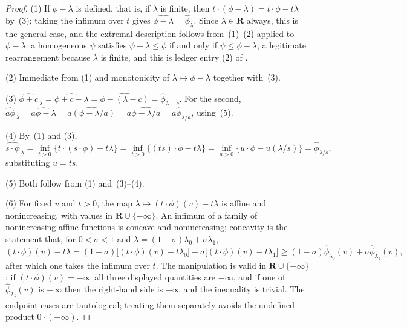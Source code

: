 \begin{proof}
(1)  If $\phi-\lambda$ is defined, that is, if $\lambda$ is finite,
then $t\cdot(\phi-\lambda)=t\cdot\phi-t\lambda$ by
\,(3); taking the infimum over $t$ gives
$\widehat{\phi-\lambda}=\widehat\phi_\lambda$.  Since
$\lambda\in\mathbf R$ always, this is the general case, and the extremal
description follows from
\,(1)--(2) applied to
$\phi-\lambda$: a homogeneous $\psi$ satisfies $\psi+\lambda\leq\phi$
if and only if $\psi\leq\phi-\lambda$, a legitimate rearrangement because
$\lambda$ is finite, and this is ledger entry (2) of
.

(2)  Immediate from (1) and monotonicity of
$\lambda\mapsto\phi-\lambda$ together with
\,(3).

(3)  $\widehat{\phi+c}_{\,\lambda}=\widehat{\phi+c-\lambda}
=\widehat{\phi-(\lambda-c)}=\widehat\phi_{\lambda-c}$.  For the second,
$\widehat{a\phi}_{\,\lambda}=\widehat{a\phi-\lambda}
=\widehat{a(\phi-\lambda/a)}=a\widehat{\phi-\lambda/a}
=a\widehat\phi_{\lambda/a}$, using
\,(5).

(4)  By \,(1) and (3),
\[
 \widehat{s\cdot\phi}_{\,\lambda}
 =\inf_{t>0}\{t\cdot(s\cdot\phi)-t\lambda\}
 =\inf_{t>0}\{(ts)\cdot\phi-t\lambda\}
 =\inf_{u>0}\{u\cdot\phi-u(\lambda/s)\}
 =\widehat\phi_{\lambda/s},
\]
substituting $u=ts$.

(5)  Both follow from (1) and
\,(3)--(4).

(6)  For fixed $v$ and $t>0$, the map
$\lambda\mapsto(t\cdot\phi)(v)-t\lambda$ is affine and nonincreasing, with
values in $\mathbf R\cup\{-\infty\}$.  An infimum of a family of
nonincreasing affine functions is concave and nonincreasing; concavity is
the statement that, for $0<\sigma<1$ and
$\lambda=(1-\sigma)\lambda_0+\sigma\lambda_1$,
\[
 (t\cdot\phi)(v)-t\lambda
 =(1-\sigma)\bigl[(t\cdot\phi)(v)-t\lambda_0\bigr]
 +\sigma\bigl[(t\cdot\phi)(v)-t\lambda_1\bigr]
 \geq(1-\sigma)\widehat\phi_{\lambda_0}(v)+\sigma\widehat\phi_{\lambda_1}(v),
\]
after which one takes the infimum over $t$.  The manipulation is valid in
$\mathbf R\cup\{-\infty\}$: if $(t\cdot\phi)(v)=-\infty$ all three
displayed quantities are $-\infty$, and if one of
$\widehat\phi_{\lambda_j}(v)$ is $-\infty$ then the right-hand side is
$-\infty$ and the inequality is trivial.  The endpoint cases are
tautological; treating them separately avoids the undefined product
$0\cdot(-\infty)$.
\end{proof}

